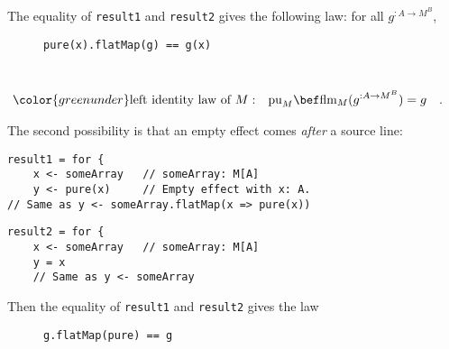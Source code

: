 \noindent \vspace{0.1\baselineskip}
The equality of \lstinline!result1! and \lstinline!result2! gives
the following law: for all $g^{:A\rightarrow M^{B}}$,

\begin{wrapfigure}{l}{0.3\columnwidth}%
\vspace{-0.9\baselineskip}
\begin{lstlisting}
pure(x).flatMap(g) == g(x)
\end{lstlisting}
\vspace{-0.6\baselineskip}
\end{wrapfigure}%

~\vspace{-1.4\baselineskip}
\begin{align}
{\color{greenunder}\text{left identity law of }M:}\quad & \text{pu}_{M}\bef\text{flm}_{M}(g^{:A\rightarrow M^{B}})=g\quad.\label{eq:monad-left-identity-law-for-flatMap}
\end{align}
\vspace{-1.2\baselineskip}

The second possibility is that an empty effect comes \emph{after}
a source line:

\noindent \texttt{\textcolor{blue}{\footnotesize{}}}%
\begin{minipage}[c]{0.475\columnwidth}%
\texttt{\textcolor{blue}{\footnotesize{}}}
\begin{lstlisting}
result1 = for {
    x <- someArray   // someArray: M[A]
    y <- pure(x)     // Empty effect with x: A.
// Same as y <- someArray.flatMap(x => pure(x))
\end{lstlisting}
%
\end{minipage}\texttt{\textcolor{blue}{\footnotesize{}\hspace*{\fill}}}%
\begin{minipage}[c]{0.475\columnwidth}%
\texttt{\textcolor{blue}{\footnotesize{}}}
\begin{lstlisting}
result2 = for {
    x <- someArray   // someArray: M[A]
    y = x
    // Same as y <- someArray
\end{lstlisting}
%
\end{minipage}{\footnotesize\par}

\noindent \vspace{0.1\baselineskip}
Then the equality of \lstinline!result1! and \lstinline!result2!
gives the law

\begin{wrapfigure}{l}{0.3\columnwidth}%
\vspace{-0.85\baselineskip}
\begin{lstlisting}
g.flatMap(pure) == g
\end{lstlisting}
\vspace{-0.6\baselineskip}
\end{wrapfigure}%

